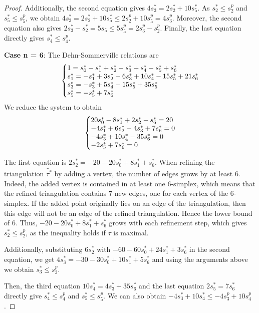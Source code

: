 \documentclass[12pt]{article}
\theoremstyle{definition}
\begin{document}
\begin{proof}
    Additionally, the second equation gives $4s_3^* = 2s_2^* + 10 s_5^*$. As $s_2^* \leq s_2^p$ and $s_5^* \leq s_5^p$, we obtain $4s_3^* = 2s_2^* + 10 s_5^* \leq 2s_2^p + 10 s_5^p = 4s_3^p$. Moreover, the second equation also gives $2s_3^* - s_2^* = 5s_5 \leq 5s_5^p = 2s_3^p -s_2^p$. Finally, the last equation directly gives $s_4^* \leq s_4^p$.

    \textbf{Case n = 6}: The Dehn-Sommerville relations are
    \begin{equation*}
        \left\{\begin{array}{@{}l@{}}
            1 = s_0^* - s_1^* + s_2^* - s_3^* + s_4^* - s_5^* + s_6^*\\
            s_1^* = -s_1^* + 3 s_2^* - 6 s_3^* + 10 s_4^* - 15 s_5^* + 21 s_6^*\\
            s_3^* = -s_3^* + 5 s_4^* - 15 s_5^* + 35 s_5^*\\
            s_5^* = -s_5^* + 7 s_6^*
        \end{array}\right.
    \end{equation*}
    We reduce the system to obtain
    \begin{equation*}
        \left\{\begin{array}{@{}l@{}}
            20 s_0^* - 8 s_1^* + 2 s_2^* - s_6^* = 20\\
            - 4 s_1^* + 6 s_2^* - 4 s_3^* + 7 s_6^* = 0\\
            - 4 s_3^* + 10 s_4^* - 35 s_6^* = 0\\
            -2 s_5^* + 7 s_6^* = 0
        \end{array}\right.
    \end{equation*}

    The first equation is $2s_2^* = -20 - 20 s_0^* + 8 s_1^* + s_6^*$. When refining the triangulation $\widetilde{\tau^*}$ by adding a vertex, the number of edges grows by at least $6$. Indeed, the added vertex is contained in at least one $6$-simplex, which means that the refined triangulation contains $7$ new edges, one for each vertex of the $6$-simplex. If the added point originally lies on an edge of the triangulation, then this edge will not be an edge of the refined triangulation. Hence the lower bound of $6$. Thus, $-20 - 20 s_0^* + 8 s_1^* + s_6^*$ grows with each refinement step, which gives $s_2^* \leq s_2^p$, as the inequality holds if $\tau$ is maximal.

    Additionally, substituting $6s_2^*$ with $- 60 - 60 s_0^* + 24 s_1^* + 3 s_6^*$ in the second equation, we get $4 s_3^* = -30 - 30 s_0^* + 10 s_1^* + 5 s_6^*$ and using the arguments above we obtain $s_3^* \leq s_3^p$.

    Then, the third equation $10 s_4^* = 4 s_3^* + 35 s_6^*$ and the last equation $2 s_5^* = 7 s_6^*$ directly give $s_4^* \leq s_4^p$ and $s_5^* \leq s_5^p$. We can also obtain $- 4 s_3^* + 10 s_4^* \leq - 4 s_3^p + 10 s_4^p$.

    
\end{proof}
\end{document}
